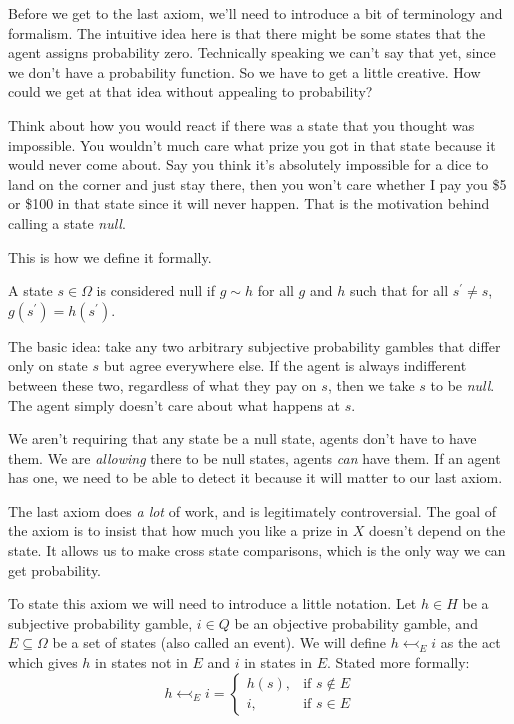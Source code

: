 Before we get to the last axiom, we'll need to introduce a bit of terminology and formalism.  The intuitive idea here is that there might be some states that the agent assigns probability zero. Technically speaking we can't say that yet, since we don't have a probability function. So we have to get a little creative.  How could we get at that idea without appealing to probability?

Think about how you would react if there was a state that you thought was impossible.  You wouldn't much care what prize you got in that state because it would never come about.  Say you think it's absolutely impossible for a dice to land on the corner and just stay there, then you won't care whether I pay you \$5 or \$100 in that state since it will never happen. That is the motivation behind calling a state {\it null}. 

This is how we define it formally.
\begin{definition}
A state $s \in \Omega$ is considered null if $g \sim h$ for all $g$ and $h$ such that for all $s^\prime \ne s$, $g(s^\prime) = h(s^\prime)$.
\end{definition}
The basic idea: take any two arbitrary subjective probability gambles that differ only on state $s$ but agree everywhere else.  If the agent is always indifferent between these two, regardless of what they pay on $s$, then we take $s$ to be {\it null}.  The agent simply doesn't care about what happens at $s$.

We aren't requiring that any state be a null state, agents don't have to have them. We are {\it allowing} there to be null states, agents {\it can} have them. If an agent has one, we need to be able to detect it because it will matter to our last axiom.

The last axiom does {\it a lot} of work, and is legitimately controversial.  The goal of the axiom is to insist that how much you like a prize in $X$ doesn't depend on the state.  It allows us to make cross state comparisons, which is the only way we can get probability.  

To state this axiom we will need to introduce a little notation.  Let $h \in H$ be a subjective probability gamble, $i \in Q$ be an objective probability gamble, and $E \subseteq \Omega$ be a set of states (also called an event).  We will define $h \leftarrowtail_E i$ as the act which gives $h$ in states not in $E$ and $i$ in states in $E$.  Stated more formally:
\begin{equation*}
h \leftarrowtail_E i = \begin{cases}
    h(s), & \text{if } s \notin E \\
    i,   & \text{if } s \in E
\end{cases}
\end{equation*}

